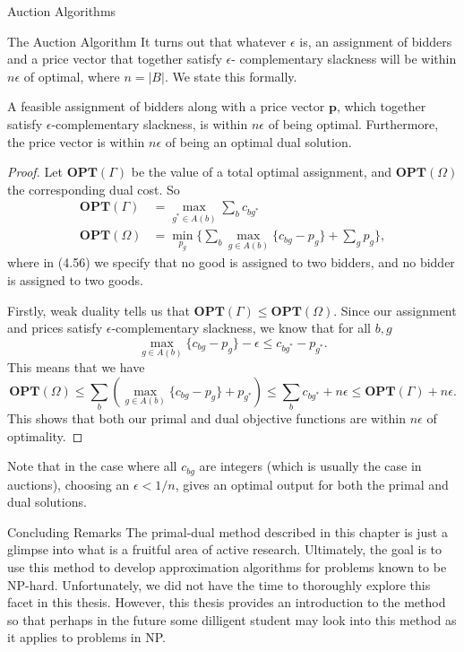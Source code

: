 \begin{section}{Auction Algorithms}
\begin{subsection}{The Auction Algorithm}
		It turns out that whatever $\epsilon$ is, 
		an assignment of bidders and a price vector that together satisfy $\epsilon$-
		complementary slackness will be within $n\epsilon$ of optimal, where $n=|B|$. 
		We state this formally.
		\begin{theorem}
			A feasible assignment of bidders along with a price vector $\mathbf{p}$, 
			which together satisfy $\epsilon$-complementary slackness, 
			is within $n\epsilon$ of being optimal. 
			Furthermore, the price vector is within $n\epsilon$ of being an optimal dual 
			solution.
		\end{theorem}
		\begin{proof}
			Let $\mathbf{OPT}(\Gamma)$ be the value of a total optimal assignment, and 
			$\mathbf{OPT}(\Omega)$ the corresponding dual cost. So 
			\begin{align}
				\mathbf{OPT}(\Gamma) &= \max_{g^{*}\in A(b)} \sum_b c_{bg^{*}} \\
				\mathbf{OPT}(\Omega) &= \min_{p_g} \{\sum_b \max_{g\in A(b)} 
				\{c_{bg} - p_g\} + \sum_g p_g\},
			\end{align}
			where in (4.56) we specify that no good is assigned to two bidders, and no bidder 
			is assigned to two goods.

			Firstly, weak duality tells us that $\mathbf{OPT}(\Gamma) \leq 
			\mathbf{OPT}(\Omega)$. Since our assignment 
			and prices satisfy $\epsilon$-complementary slackness, we know that for all $b,g$
			\[
				\max_{g\in A(b)} \{c_{bg} - p_g\} - \epsilon \leq c_{bg^{*}} - p_{g^{*}}.
			\]
			This means that we have 
			\[
				\mathbf{OPT}(\Omega) \leq \sum_b \left(\max_{g\in A(b)} 
				\{c_{bg} - p_g\} + p_{g^{*}} 
				\right) \leq \sum_b c_{bg^{*}} + n\epsilon \leq 
				\mathbf{OPT}(\Gamma) + n\epsilon.
			\]
			This shows that both our primal and dual objective functions are within 
			$n\epsilon$ of optimality.
		\end{proof}
		Note that in the case where all $c_{bg}$ are integers (which is usually the case in 
		auctions), choosing an $\epsilon < 1/n$, gives an optimal output for both the primal 
		and dual solutions.
\end{subsection}
\end{section}
\begin{section}{Concluding Remarks}
The primal-dual method described in this chapter is just a glimpse into what is a fruitful area of 
active research. Ultimately, the goal is to use this method to develop approximation algorithms 
for problems known to be NP-hard. Unfortunately, we did not have the time to thoroughly explore 
this facet in this thesis. However, this thesis provides an introduction to the method so that 
perhaps in the future some dilligent student may look into this method as it applies to problems in NP.
\end{section}
